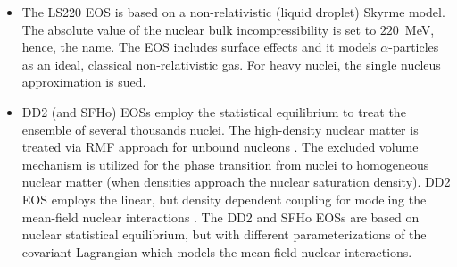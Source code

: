 \begin{itemize}
    \item The LS220 \ac{EOS} is based on a non-relativistic (liquid droplet) Skyrme model.
    The absolute value of the nuclear bulk incompressibility is set to $220$~MeV, hence, the name.
    The \ac{EOS} includes surface effects and it models $\alpha$-particles as an ideal, classical
    non-relativistic gas. For heavy nuclei, the single nucleus approximation is sued. 
    \item DD2 (and SFHo) \acp{EOS} employ the statistical equilibrium to treat the ensemble of several thousands nuclei.
    The high-density nuclear matter is treated via \ac{RMF} approach for unbound nucleons \citep{Hempel:2009mc}.
    The excluded volume mechanism is utilized for the phase transition from nuclei to homogeneous
    nuclear matter (when densities approach the nuclear saturation density).
    DD2 \ac{EOS} employs the linear, but density dependent coupling for modeling the mean-field nuclear interactions 
    \citep{Typel:2009sy}.
    The DD2 and SFHo \acp{EOS} are based on nuclear statistical equilibrium, but with 
    different parameterizations of the covariant Lagrangian which models the mean-field nuclear interactions.

\end{itemize}
